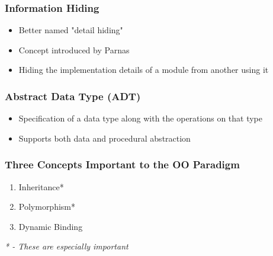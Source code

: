 \documentclass{report}
\begin{document}
				\subsubsection{Information Hiding}
					\begin{itemize}
						\item Better named "detail hiding"
						\item Concept introduced by Parnas
						\item Hiding the implementation details of a module from another using it
					\end{itemize}
				\subsubsection{Abstract Data Type (ADT)}
					\begin{itemize}
						\item Specification of a data type along with the operations on that type
						\item Supports both data and procedural abstraction
					\end{itemize}
				\subsubsection{Three Concepts Important to the OO Paradigm}
					\begin{enumerate}
						\item Inheritance*
						\item Polymorphism*
						\item Dynamic Binding
					\end{enumerate}
					\textit{* - These are especially important}
\end{document}
